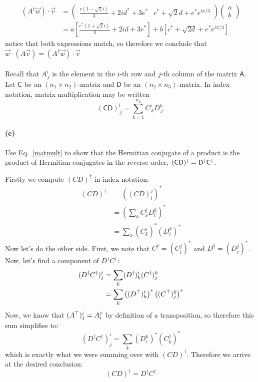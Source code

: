 \documentclass{article}
\begin{document}
\begin{solution}
\begin{align*}
		(A^\dagger \vec w) \cdot \vec v &= \begin{pmatrix} \frac{c(1 - \sqrt{2}i)}{3} + 2id^* + 3e^* & c^* + \sqrt{2}d + e^*e^{i \pi /3} \end{pmatrix} \begin{pmatrix} a\\b \end{pmatrix}\\
										&=  a\left[\frac{c^*(1 + \sqrt{2}i)}{3} + 2id + 3e^*\right] +
										b\left[c^* + \sqrt{2d} + e^*e^{i \pi /3}\right]
	\end{align*}
	notice that both expressions match, so therefore we conclude that $\vec w \cdot (A \vec v) = (A^\dagger \vec w) \cdot \vec v$
\end{solution}

\paragraph{}
Recall that $A^{i}_{\,j}$ is the element in the $i$-th row and $j$-th column of the matrix $\mathsf{A}$.  Let $\mathsf{C}$ be an $(n_{1}\times n_{2})$-matrix and $\mathsf{D}$ 
be an 
$(n_{2}\times n_{3})$-matrix.  In index notation, matrix multiplication may be written
	\begin{equation}
		(\mathsf{CD})^{i}_{\,j} = \sum_{k=1}^{n_{2}} C^{i}_{\,k}D^{k}_{\,j}.
	\label{matmult}
	\end{equation}

\paragraph{(e)}
Use Eq.~\ref{matmult} to show that the Hermitian conjugate of a product is the product of Hermitian conjugates in the reverse order, 
$(\mathsf{CD})^{\dagger} = \mathsf{D}^{\dagger}\mathsf{C}^{\dagger}$.

\begin{solution}
	Firstly we compute $(CD)^\dagger$ in index notation:
	\begin{align*}
		(CD)^\dagger &= \left( (CD)^j_i\right)^*\\
					 &= \left( \sum_k C^j_k D^k_i\right)^*\\
					 &= \sum_k (C^j_k)^*(D^k_i)^*
	\end{align*}	
	Now let's do the other side. First, we note that $C^\dagger = (C^j_i)^*$ and $D^\dagger = (D^j_i)^*$. Now, 
	let's find a component of $D^\dagger C^\dagger$:
	\begin{align*}
		(D^\dagger C^\dagger)^i_j &= \sum_k (D^\dagger)^i_k (C^\dagger)^k_j\\
								  &= \sum_k \left((D^\top)^i_k\right)^* \left( (C^\top)^k_j\right)^*
	\end{align*}
	Now, we know that $(A^\top)^i_j = A^j_i$ by definition of a transposition, so therefore this sum simplifies to:
	\[
		(D^\dagger C^\dagger)^i_j = \sum_k (D^k_i)^* (C_k^j)^*
	\] 
	which is exactly what we were summing over with $(CD)^\dagger$. Therefore we arrive at the desired 
	conclusion:
	\[
		(CD)^\dagger = D^\dagger C^\dagger
	\] 
\end{solution}

\endofhomework
\addfooter
\end{document}

